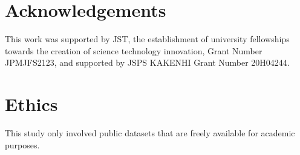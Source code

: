 \documentclass[runningheads]{llncs}
\begin{document}
\section*{Acknowledgements}
This work was supported by JST, the establishment of university fellowships towards the creation of science technology innovation, Grant Number JPMJFS2123, and supported by JSPS KAKENHI Grant Number 20H04244.

\clearpage
\section*{Ethics}
This study only involved public datasets that are freely available for academic purposes.



\end{document}
